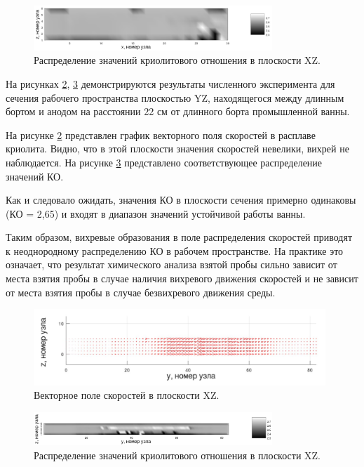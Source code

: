 \documentclass[]{pmi}
\begin{document}
\begin{figure}[H]
    \centering
    \includegraphics[width=90mm]{heatmapxz_art.png}
    \caption{Распределение значений криолитового отношения в плоскости XZ.}
    \label{fig:crxz} 
\end{figure}

На рисунках \ref{fig:veloyz}, \ref{fig:cryz} демонстрируются результаты численного эксперимента для сечения рабочего пространства плоскостью YZ, находящегося между длинным бортом и анодом на расстоянии 22 см от длинного борта промышленной ванны.	

На рисунке \ref{fig:veloyz} представлен график векторного поля скоростей в расплаве криолита. Видно, что в этой плоскости значения скоростей невелики, вихрей не наблюдается. На рисунке \ref{fig:cryz} представлено соответствующее распределение значений КО.

Как и следовало ожидать, значения КО в плоскости сечения примерно одинаковы (КО = 2,65) и входят в диапазон значений устойчивой работы ванны. 

Таким образом, вихревые образования в поле распределения скоростей приводят к неоднородному распределению КО в рабочем пространстве. На практике это означает, что результат химического анализа взятой пробы сильно зависит от места взятия пробы в случае наличия вихревого движения скоростей и не зависит от места взятия пробы в случае безвихревого движения среды.

\begin{figure}[H]
    \centering
    \includegraphics[width=110mm]{veloyz_art.png}
    \caption{Векторное поле скоростей в плоскости XZ.}
    \label{fig:veloyz} 
\end{figure}

\begin{figure}[H]
    \centering
    \includegraphics[width=90mm]{heatmapyz_art.png}
    \caption{Распределение значений криолитового отношения в плоскости XZ.}
    \label{fig:cryz} 
\end{figure}
\end{document}
